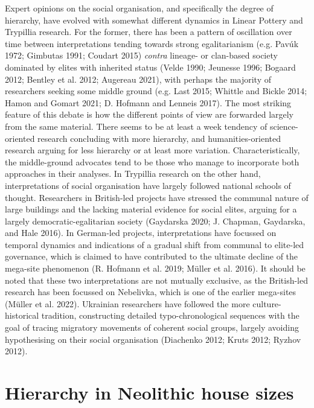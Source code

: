\documentclass[
  12pt,
  a4paper, twoside]{book}
\begin{document}
Expert opinions on the social organisation, and specifically the degree of hierarchy, have evolved with somewhat different dynamics in Linear Pottery and Trypillia research. For the former, there has been a pattern of oscillation over time between interpretations tending towards strong egalitarianism (e.g. Pavúk 1972; Gimbutas 1991; Coudart 2015) \emph{contra} lineage- or clan-based society dominated by elites with inherited status (Velde 1990; Jeunesse 1996; Bogaard 2012; Bentley et al. 2012; Augereau 2021), with perhaps the majority of researchers seeking some middle ground (e.g. Last 2015; Whittle and Bickle 2014; Hamon and Gomart 2021; D. Hofmann and Lenneis 2017). The most striking feature of this debate is how the different points of view are forwarded largely from the same material. There seems to be at least a week tendency of science-oriented research concluding with more hierarchy, and humanities-oriented research arguing for less hierarchy or at least more variation. Characteristically, the middle-ground advocates tend to be those who manage to incorporate both approaches in their analyses. In Trypillia research on the other hand, interpretations of social organisation have largely followed national schools of thought. Researchers in British-led projects have stressed the communal nature of large buildings and the lacking material evidence for social elites, arguing for a largely democratic-egalitarian society (Gaydarska 2020; J. Chapman, Gaydarska, and Hale 2016). In German-led projects, interpretations have focussed on temporal dynamics and indications of a gradual shift from communal to elite-led governance, which is claimed to have contributed to the ultimate decline of the mega-site phenomenon (R. Hofmann et al. 2019; Müller et al. 2016). It should be noted that these two interpretations are not mutually exclusive, as the British-led research has been focussed on Nebelivka, which is one of the earlier mega-sites (Müller et al. 2022). Ukrainian researchers have followed the more culture-historical tradition, constructing detailed typo-chronological sequences with the goal of tracing migratory movements of coherent social groups, largely avoiding hypothesising on their social organisation (Diachenko 2012; Kruts 2012; Ryzhov 2012).

\hypertarget{hierarchy-in-neolithic-house-sizes}{%
\section{Hierarchy in Neolithic house sizes}\label{hierarchy-in-neolithic-house-sizes}}
\end{document}
